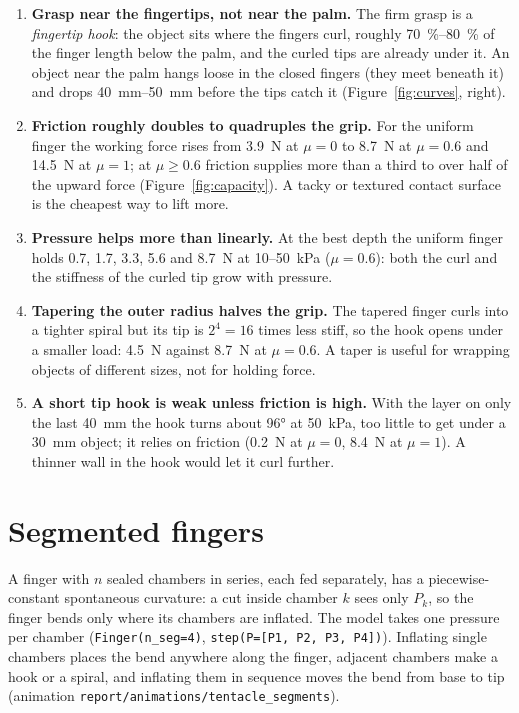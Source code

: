\documentclass[11pt,a4paper]{article}
\numberwithin{equation}{section}
\begin{document}
\begin{enumerate}
\item \textbf{Grasp near the fingertips, not near the palm.} The firm grasp is a \emph{fingertip hook}: the object
sits where the fingers curl, roughly \SIrange{70}{80}{\percent} of the finger length below the palm, and the curled
tips are already under it. An object near the palm hangs loose in the closed fingers (they meet beneath it) and
drops \SIrange{40}{50}{mm} before the tips catch it (Figure~\ref{fig:curves}, right).
\item \textbf{Friction roughly doubles to quadruples the grip.} For the uniform finger the working force rises from
\SI{3.9}{N} at $\mu=0$ to \SI{8.7}{N} at $\mu=0.6$ and \SI{14.5}{N} at $\mu=1$; at $\mu\ge0.6$ friction supplies
more than a third to over half of the upward force (Figure~\ref{fig:capacity}). A tacky or textured contact
surface is the cheapest way to lift more.
\item \textbf{Pressure helps more than linearly.} At the best depth the uniform finger holds 0.7, 1.7, 3.3, 5.6 and
\SI{8.7}{N} at 10--\SI{50}{kPa} ($\mu=0.6$): both the curl and the stiffness of the curled tip grow with pressure.
\item \textbf{Tapering the outer radius halves the grip.} The tapered finger curls into a tighter spiral but its tip
is $2^4=16$ times less stiff, so the hook opens under a smaller load: \SI{4.5}{N} against \SI{8.7}{N} at
$\mu=0.6$. A taper is useful for wrapping objects of different sizes, not for holding force.
\item \textbf{A short tip hook is weak unless friction is high.} With the layer on only the last \SI{40}{mm}
the hook turns about \ang{96} at \SI{50}{kPa}, too little to get under a \SI{30}{mm} object; it relies on friction
(\SI{0.2}{N} at $\mu=0$, \SI{8.4}{N} at $\mu=1$). A thinner wall in the hook would let it curl further.
\end{enumerate}

\section{Segmented fingers}
A finger with $n$ sealed chambers in series, each fed separately, has a piecewise-constant spontaneous curvature:
a cut inside chamber $k$ sees only $P_k$, so the finger bends only where its chambers are inflated. The model
takes one pressure per chamber (\texttt{Finger(n\_seg=4)}, \texttt{step(P=[P1, P2, P3, P4])}). Inflating single
chambers places the bend anywhere along the finger, adjacent chambers make a hook or a spiral, and inflating them
in sequence moves the bend from base to tip (animation \texttt{report/animations/tentacle\_segments}).
\end{document}
